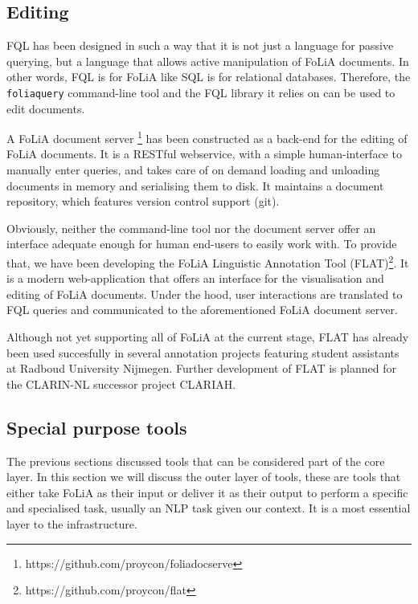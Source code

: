 \documentclass[a4paper,10pt,twoside]{article}
\begin{document}
\subsection{Editing}

FQL has been designed in such a way that it is not just a language for
passive querying, but a language that allows active manipulation of FoLiA
documents. In other words, FQL is for FoLiA like SQL is for relational
databases. Therefore, the \texttt{foliaquery} command-line tool and the FQL
library it relies on can be used to edit documents. 

A FoLiA document server \footnote{https://github.com/proycon/foliadocserve} has
been constructed as a back-end for the editing of FoLiA documents. It is a
RESTful webservice, with a simple human-interface to manually enter queries,
and takes care of on demand loading and unloading documents in memory and
serialising them to disk. It maintains a document repository, which features
version control support (git).

Obviously, neither the command-line tool nor the document server offer an
interface adequate enough for human end-users to easily work with. To provide
that, we have been developing the FoLiA Linguistic Annotation Tool
(FLAT)\footnote{https://github.com/proycon/flat}. It is a modern
web-application that offers an interface for the visualisation and editing of
FoLiA documents. Under the hood, user interactions are translated to FQL
queries and communicated to the aforementioned FoLiA document server.

Although not yet supporting all of FoLiA at the current stage, FLAT has already
been used succesfully in several annotation projects featuring student
assistants at Radboud University Nijmegen. Further development of FLAT is
planned for the CLARIN-NL successor project CLARIAH.

\subsection{Special purpose tools}

The previous sections discussed tools that can be considered part of the
core layer. In this section we will discuss the outer layer of tools, these are
tools that either take FoLiA as their input or deliver it as their output to
perform a specific and specialised task, usually an NLP task given our context.
It is a most essential layer to the infrastructure.
\end{document}
